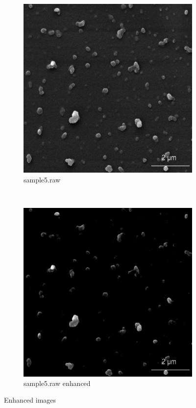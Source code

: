 \documentclass{article}
\begin{document}
\begin{figure}[!htb]
    \begin{subfigure}[b]{0.3\textwidth}
        \includegraphics[width=\textwidth]{img/I5.png}
        \caption{sample5.raw}
    \end{subfigure}
    ~
    \begin{subfigure}[b]{0.3\textwidth}
        \includegraphics[width=\textwidth]{img/I5_EC.png}
        \caption{sample5.raw enhanced}
    \end{subfigure}
    \caption{Enhanced images}
\end{figure}
\end{document}
